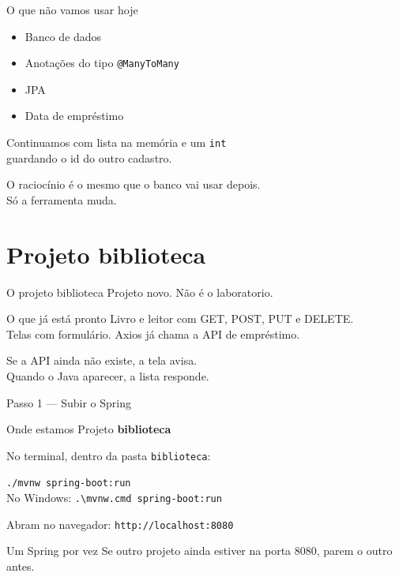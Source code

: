 \documentclass[aspectratio=169,11pt]{beamer}
\newcommand{\onde}[1]{%
  \begin{block}{Onde estamos}
    #1
  \end{block}
}
\begin{document}
\begin{frame}{O que não vamos usar hoje}
  \begin{itemize}
    \item Banco de dados
    \item Anotações do tipo \texttt{@ManyToMany}
    \item JPA
    \item Data de empréstimo
  \end{itemize}

  \vspace{0.5em}
  Continuamos com lista na memória e um \texttt{int}\\
  guardando o id do outro cadastro.

  \vspace{0.5em}
  O raciocínio é o mesmo que o banco vai usar depois.\\
  Só a ferramenta muda.
\end{frame}

\section{Projeto biblioteca}

\begin{frame}{O projeto biblioteca}
  Projeto novo. Não é o laboratorio.

  \vspace{0.5em}
  \begin{block}{O que já está pronto}
    Livro e leitor com GET, POST, PUT e DELETE.\\
    Telas com formulário. Axios já chama a API de empréstimo.
  \end{block}

  \vspace{0.5em}
  Se a API ainda não existe, a tela avisa.\\
  Quando o Java aparecer, a lista responde.
\end{frame}

\begin{frame}{Passo 1 --- Subir o Spring}
  \onde{Projeto \textbf{biblioteca}}

  No terminal, dentro da pasta \texttt{biblioteca}:

  \vspace{0.4em}
  \texttt{./mvnw spring-boot:run}\\
  {\small No Windows: \texttt{.\textbackslash mvnw.cmd spring-boot:run}}

  \vspace{0.5em}
  Abram no navegador: \texttt{http://localhost:8080}

  \vspace{0.5em}
  \begin{alertblock}{Um Spring por vez}
    Se outro projeto ainda estiver na porta 8080,
    parem o outro antes.
  \end{alertblock}
\end{frame}
\end{document}
